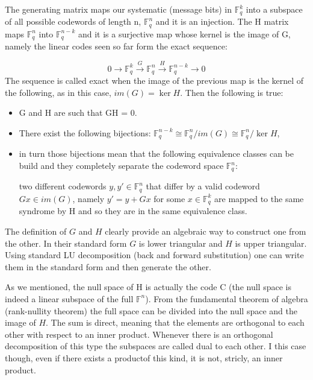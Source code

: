 \begin{info}
The generating matrix maps our systematic (message bits) in $\mathbb{F}_{q}^{k}$ into a subspace of all possible codewords of length n, $\mathbb{F}_{q}^{n}$  and it is an injection. The H matrix maps $\mathbb{F}_{q}^{n}$ into $\mathbb{F}_{q}^{n-k}$ and it is a surjective map whose kernel is the image of G, namely the linear codes seen so far form the exact sequence:

\begin{equation}
	0 \rightarrow \mathbb{F}_{q}^{k} \xrightarrow{G} \mathbb{F}_{q}^{n} \xrightarrow{H} \mathbb{F}_{q}^{n-k} \longrightarrow 0
\end{equation}
The sequence is called exact when the image of the previous map is the kernel of the following, as in this case, $im(G) = \ker H$. Then the following is true:
\begin{itemize}
	\item G and H are such that GH = 0.
	\item There exist the following bijections: $\mathbb{F}_{q}^{n - k} \cong \mathbb{F}_{q}^{n} / im(G) \cong \mathbb{F}_{q}^{n} / \ker H$,
	\item in turn those bijections mean that the following equivalence classes can be build and they completely separate the codeword space $\mathbb{F}_{q}^{n}$:

	two different codewords $y, y\prime \in \mathbb{F}_{q}^{n}$ that differ by a valid codeword $Gx \in im(G)$, namely $y\prime = y + Gx$ for some $x\in \mathbb{F}_{q}^{k}$ are mapped to the same syndrome by H and so they are in the same equivalence class.
\end{itemize}

\end{info}

The definition of $G$ and $H$ clearly provide an algebraic way to construct one from the other. In their standard form $G$ is lower triangular and $H$ is upper triangular. Using standard LU decomposition (back and forward substitution) one can write them in the standard form and then generate the other.

\begin{info}
	As we mentioned, the null space of H is actually the code C (the null space is indeed a linear subspace of the full $\mathbb{F}^n$). From the fundamental theorem of algebra (rank-nullity theorem) the full space can be divided into the null space and the image of $H$. The sum is direct, meaning that the elements are orthogonal to each other with respect to an inner product. Whenever there is an orthogonal decomposition of this type the subspaces are called dual to each other. I this case though, even if there exists a productof this kind, it is not, stricly, an inner product.
\end{info}

